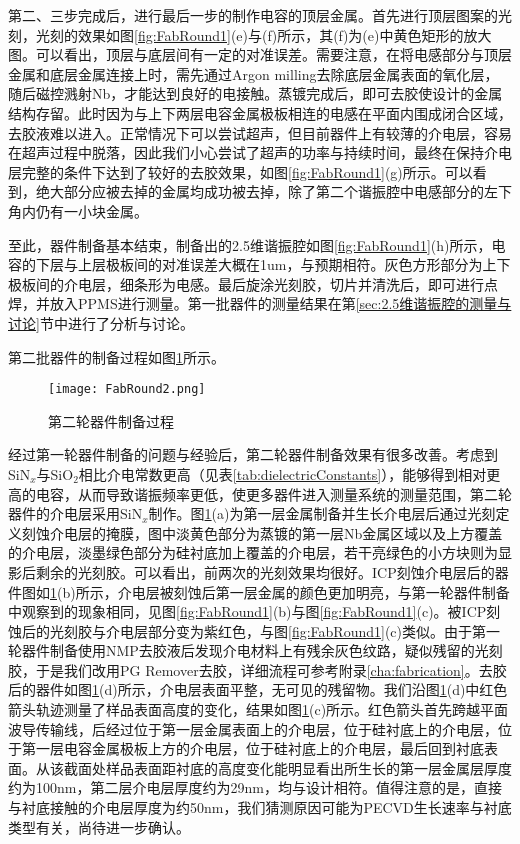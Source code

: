             第二、三步完成后，进行最后一步的制作电容的顶层金属。首先进行顶层图案的光刻，光刻的效果如图\ref{fig:FabRound1}(e)与(f)所示，其(f)为(e)中黄色矩形的放大图。可以看出，顶层与底层间有一定的对准误差。需要注意，在将电感部分与顶层金属和底层金属连接上时，需先通过Argon milling去除底层金属表面的氧化层，随后磁控溅射Nb，才能达到良好的电接触。蒸镀完成后，即可去胶使设计的金属结构存留。此时因为与上下两层电容金属极板相连的电感在平面内围成闭合区域，去胶液难以进入。正常情况下可以尝试超声，但目前器件上有较薄的介电层，容易在超声过程中脱落，因此我们小心尝试了超声的功率与持续时间，最终在保持介电层完整的条件下达到了较好的去胶效果，如图\ref{fig:FabRound1}(g)所示。可以看到，绝大部分应被去掉的金属均成功被去掉，除了第二个谐振腔中电感部分的左下角内仍有一小块金属。

            至此，器件制备基本结束，制备出的2.5维谐振腔如图\ref{fig:FabRound1}(h)所示，电容的下层与上层极板间的对准误差大概在1um，与预期相符。灰色方形部分为上下极板间的介电层，细条形为电感。最后旋涂光刻胶，切片并清洗后，即可进行点焊，并放入PPMS进行测量。第一批器件的测量结果在第\ref{sec:2.5维谐振腔的测量与讨论}节中进行了分析与讨论。


            第二批器件的制备过程如图\ref{fig:FabRound2}所示。



            \begin{figure}[h]
                \centering
                \texttt{[image: FabRound2.png]}
                \caption{第二轮器件制备过程}
                \label{fig:FabRound2}
            \end{figure}

            经过第一轮器件制备的问题与经验后，第二轮器件制备效果有很多改善。考虑到SiN$_x$与SiO$_2$相比介电常数更高（见表\ref{tab:dielectricConstants}），能够得到相对更高的电容，从而导致谐振频率更低，使更多器件进入测量系统的测量范围，第二轮器件的介电层采用SiN$_x$制作。图\ref{fig:FabRound2}(a)为第一层金属制备并生长介电层后通过光刻定义刻蚀介电层的掩膜，图中淡黄色部分为蒸镀的第一层Nb金属区域以及上方覆盖的介电层，淡墨绿色部分为硅衬底加上覆盖的介电层，若干亮绿色的小方块则为显影后剩余的光刻胶。可以看出，前两次的光刻效果均很好。ICP刻蚀介电层后的器件图如\ref{fig:FabRound2}(b)所示，介电层被刻蚀后第一层金属的颜色更加明亮，与第一轮器件制备中观察到的现象相同，见图\ref{fig:FabRound1}(b)与图\ref{fig:FabRound1}(c)。被ICP刻蚀后的光刻胶与介电层部分变为紫红色，与图\ref{fig:FabRound1}(c)类似。由于第一轮器件制备使用NMP去胶液后发现介电材料上有残余灰色纹路，疑似残留的光刻胶，于是我们改用PG Remover去胶，详细流程可参考附录\ref{cha:fabrication}。去胶后的器件如图\ref{fig:FabRound2}(d)所示，介电层表面平整，无可见的残留物。我们沿图\ref{fig:FabRound2}(d)中红色箭头轨迹测量了样品表面高度的变化，结果如图\ref{fig:FabRound2}(c)所示。红色箭头首先跨越平面波导传输线，后经过位于第一层金属表面上的介电层，位于硅衬底上的介电层，位于第一层电容金属极板上方的介电层，位于硅衬底上的介电层，最后回到衬底表面。从该截面处样品表面距衬底的高度变化能明显看出所生长的第一层金属层厚度约为100nm，第二层介电层厚度约为29nm，均与设计相符。值得注意的是，直接与衬底接触的介电层厚度为约50nm，我们猜测原因可能为PECVD生长速率与衬底类型有关，尚待进一步确认。

